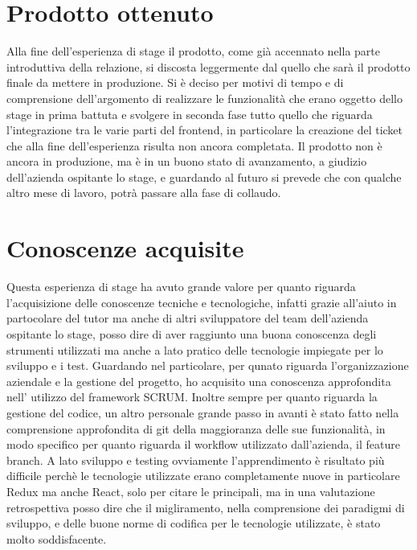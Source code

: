 \section{Prodotto ottenuto}
\label{sec:prodotto-ottenuto}
Alla fine dell'esperienza di stage il prodotto, come già accennato nella parte introduttiva della relazione, si discosta leggermente dal quello che sarà il prodotto finale da
mettere in produzione. Si è deciso per motivi di tempo e di comprensione dell'argomento di realizzare le funzionalità che erano oggetto dello stage in prima battuta e svolgere in seconda
fase tutto quello che riguarda l'integrazione tra le varie parti del frontend, in particolare la creazione del ticket che alla fine dell'esperienza risulta non ancora completata.
Il prodotto non è ancora in produzione, ma è in un buono stato di avanzamento, a giudizio dell'azienda ospitante lo stage, e guardando al futuro si prevede che con qualche altro mese di
lavoro, potrà passare alla fase di collaudo.

\section{Conoscenze acquisite}
\label{sec:conoscenze-acquisite}
Questa esperienza di stage ha avuto grande valore per quanto riguarda l'acquisizione delle conoscenze tecniche e tecnologiche, infatti grazie all'aiuto in partocolare del tutor ma anche
di altri sviluppatore del team dell'azienda ospitante lo stage, posso dire di aver raggiunto una buona conoscenza degli strumenti utilizzati ma anche a lato pratico delle tecnologie
impiegate per lo sviluppo e i test. Guardando nel particolare, per qunato riguarda l'organizzazione aziendale e la gestione del progetto, ho acquisito una conoscenza approfondita nell'
utilizzo del framework SCRUM. Inoltre sempre per quanto riguarda la gestione del codice, un altro personale grande passo in avanti è stato fatto nella comprensione approfondita
di git della maggioranza delle sue funzionalità, in modo specifico per quanto riguarda il workflow utilizzato dall'azienda, il feature branch. A lato sviluppo e testing ovviamente l'apprendimento
è risultato più difficile perchè le tecnologie utilizzate erano completamente nuove in particolare Redux ma anche React, solo per citare le principali, ma in una valutazione retrospettiva
posso dire che il migliramento, nella comprensione dei paradigmi di sviluppo, e delle buone norme di codifica per le tecnologie utilizzate, è stato molto soddisfacente.

